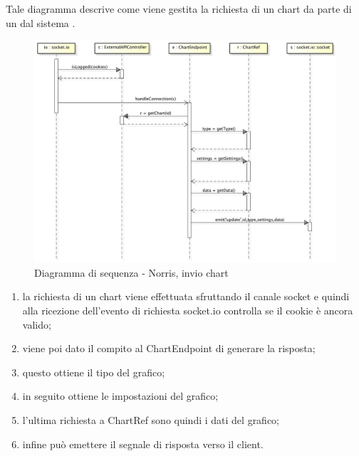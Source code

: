             
        	Tale diagramma descrive come viene gestita la richiesta di un chart da parte di un  dal sistema .
            \begin{figure}[H]
                \centering
                \includegraphics[scale=0.3]{DefinizioneDiProdotto/Pics/NorrisInvioChart}
                \caption{Diagramma di sequenza - Norris, invio chart}
            \end{figure}
            \begin{enumerate}
                \item la richiesta di un chart viene effettuata sfruttando il canale socket e quindi alla ricezione dell'evento di richiesta socket.io controlla se il cookie è ancora valido;
                \item viene poi dato il compito al ChartEndpoint di generare la risposta;
                \item questo ottiene il tipo del grafico;
                \item in seguito ottiene le impostazioni del grafico;
                \item l'ultima richiesta a ChartRef sono quindi i dati del grafico;
                \item infine può emettere il segnale di risposta verso il client.
            \end{enumerate}


